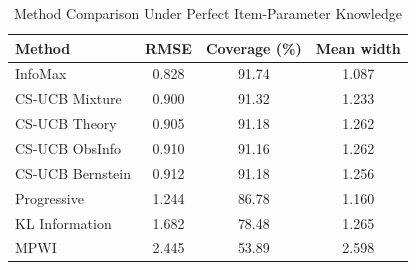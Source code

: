 \begin{table}[htbp]
\centering
\small
\caption{Method Comparison Under Perfect Item-Parameter Knowledge}
\label{tab:robustness-method-perfect}
\begin{tabular}{lccc}
\toprule
Method & RMSE & Coverage (\%) & Mean width \\
\midrule
InfoMax & 0.828 & 91.74 & 1.087 \\
CS-UCB Mixture & 0.900 & 91.32 & 1.233 \\
CS-UCB Theory & 0.905 & 91.18 & 1.262 \\
CS-UCB ObsInfo & 0.910 & 91.16 & 1.262 \\
CS-UCB Bernstein & 0.912 & 91.18 & 1.256 \\
Progressive & 1.244 & 86.78 & 1.160 \\
KL Information & 1.682 & 78.48 & 1.265 \\
MPWI & 2.445 & 53.89 & 2.598 \\
\bottomrule
\end{tabular}
\end{table}

